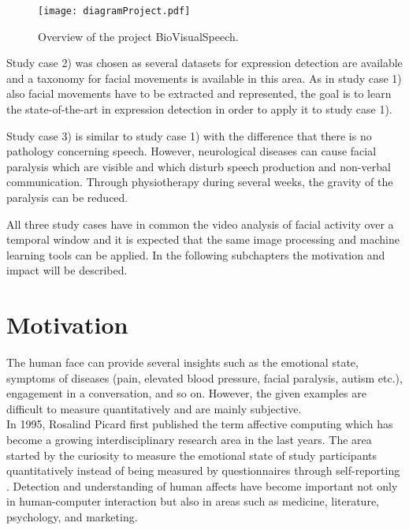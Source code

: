 \begin{figure}
    \centering
    \texttt{[image: diagramProject.pdf]}
    \caption{Overview of the project BioVisualSpeech.}
    \label{fig:project}
\end{figure}

Study case 2) was chosen as several datasets for expression detection are available and a taxonomy for facial movements is available in this area. As in study case 1) also facial movements have to be extracted and represented, the goal is to learn the state-of-the-art in expression detection in order to apply it to study case 1).

Study case 3) is similar to study case 1) with the difference that there is no pathology concerning speech. However, neurological diseases can cause facial paralysis which are visible and which disturb speech production and non-verbal communication. Through physiotherapy during several weeks, the gravity of the paralysis can be reduced. 

All three study cases have in common the video analysis of facial activity over a temporal window and it is expected that the same image processing and machine learning tools can be applied. In the following subchapters the motivation and impact will be described.  




\section{Motivation} %
\label{sec:motivation}

The human face can provide several insights such as the emotional state, symptoms of diseases (pain, elevated blood pressure, facial paralysis, autism etc.), engagement in a conversation, and so on. However, the given examples are difficult to measure quantitatively and are mainly subjective.\\

In 1995, Rosalind Picard first published the term affective computing which has become a growing interdisciplinary research area in the last years. The area started by the curiosity to measure the emotional state of study participants quantitatively instead of being measured by questionnaires through self-reporting \cite{Picard2014promise}. Detection and understanding of human affects have become important not only in human-computer interaction but also in areas such as medicine, literature, psychology, and marketing.\\

